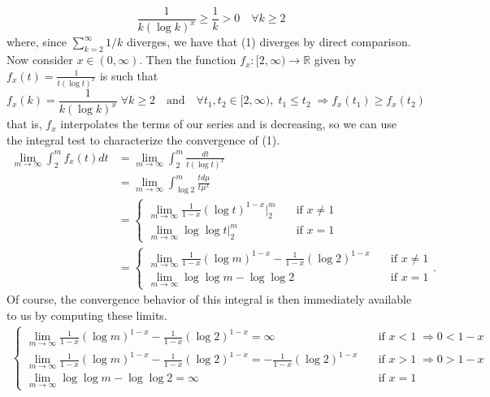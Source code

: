 \documentclass[11pt, letterpaper]{article}
\newcommand{\mbb}[1]{\mathbb{#1}}
\begin{document}
    \[\frac{1}{k(\log k)^x}\geq \frac{1}{k}>0\quad\forall k\geq 2\]
    where, since $\sum_{k=2}^\infty 1/k$ diverges, we have that (1) diverges by direct comparison.\\[10pt]
    Now consider $x\in(0,\infty)$. Then the function $f_x:[2,\infty)\rightarrow\mbb{R}$ given by
    $f_x(t)=\frac{1}{t(\log t)^x}$ is such that
    \[f_x(k)=\frac{1}{k(\log k)^x}\;\forall k\geq 2\quad\text{and}\quad \forall t_1,t_2\in[2,\infty),\;t_1\leq t_2\;\Rightarrow f_x(t_1)\geq f_x(t_2)\]
    that is, $f_x$ interpolates the terms of our series and is decreasing, so we can use the integral test to characterize the convergence of (1).
    \begin{align*}
        \lim_{m\rightarrow\infty}\int_2^m f_x(t)dt&=\lim_{m\rightarrow\infty}\int_2^m\frac{dt}{t(\log t)^x}\\
        &=\lim_{m\rightarrow\infty}\int_{\log 2}^m\frac{td\mu}{t\mu^x}\tag{letting $\mu=\log t\Rightarrow td\mu=dt$}\\
        &=\begin{cases}
            \lim_{m\rightarrow\infty}\frac{1}{1-x}(\log t)^{1-x}\big|_2^m\quad&\text{if $x\neq 1$}\\
            \lim_{m\rightarrow \infty}\log\log t\big|_2^m\quad&\text{if $x=1$}
        \end{cases}\\
        &=\begin{cases}
            \lim_{m\rightarrow\infty}\frac{1}{1-x}(\log m)^{1-x}-\frac{1}{1-x}(\log 2)^{1-x}\quad&\text{if $x\neq 1$}\\
            \lim_{m\rightarrow \infty}\log\log m-\log\log 2\quad&\text{if $x=1$}
        \end{cases}.\tag{2}
    \end{align*}
    Of course, the convergence behavior of this integral is then immediately available to us by computing these limits.
    \begin{align*}
        \begin{cases}
            \lim_{m\rightarrow\infty}\frac{1}{1-x}(\log m)^{1-x}-\frac{1}{1-x}(\log 2)^{1-x}=\infty\quad&\text{if $x<1\;\Rightarrow 0<1-x$}\\
            \lim_{m\rightarrow\infty}\frac{1}{1-x}(\log m)^{1-x}-\frac{1}{1-x}(\log 2)^{1-x}=-\frac{1}{1-x}(\log 2)^{1-x}\quad&\text{if $x>1\;\Rightarrow 0>1-x$}\\
            \lim_{m\rightarrow\infty}\log\log m - \log\log 2=\infty\quad&\text{if $x=1$}
        \end{cases}
    \end{align*}
\end{document}
